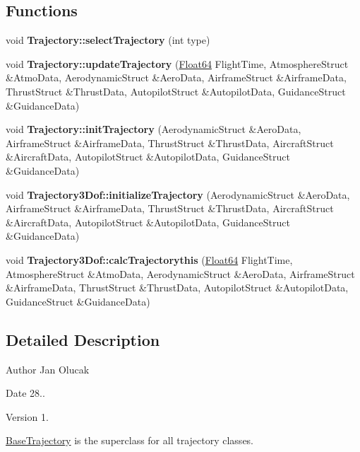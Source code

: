 \subsection*{Functions}
\begin{DoxyCompactItemize}
\item 
\mbox{\label{group___trajectory_gade7c1162e2dbb9b6a58e4b14edc47a23}} 
void {\bfseries Trajectory\+::select\+Trajectory} (int type)
\item 
\mbox{\label{group___trajectory_gac3cc55da380fc14a615f861e1a61bbc9}} 
void {\bfseries Trajectory\+::update\+Trajectory} (\hyperlink{group___tools_ga3f1431cb9f76da10f59246d1d743dc2c}{Float64} Flight\+Time, Atmosphere\+Struct \&Atmo\+Data, Aerodynamic\+Struct \&Aero\+Data, Airframe\+Struct \&Airframe\+Data, Thrust\+Struct \&Thrust\+Data, Autopilot\+Struct \&Autopilot\+Data, Guidance\+Struct \&Guidance\+Data)
\item 
\mbox{\label{group___trajectory_ga8db5cd315a89f82acb03e7ccc33a9c18}} 
void {\bfseries Trajectory\+::init\+Trajectory} (Aerodynamic\+Struct \&Aero\+Data, Airframe\+Struct \&Airframe\+Data, Thrust\+Struct \&Thrust\+Data, Aircraft\+Struct \&Aircraft\+Data, Autopilot\+Struct \&Autopilot\+Data, Guidance\+Struct \&Guidance\+Data)
\item 
\mbox{\label{group___trajectory_ga68fef9eacaf0f9d17623d8cae7d6b38f}} 
void {\bfseries Trajectory3\+Dof\+::initialize\+Trajectory} (Aerodynamic\+Struct \&Aero\+Data, Airframe\+Struct \&Airframe\+Data, Thrust\+Struct \&Thrust\+Data, Aircraft\+Struct \&Aircraft\+Data, Autopilot\+Struct \&Autopilot\+Data, Guidance\+Struct \&Guidance\+Data)
\item 
\mbox{\label{group___trajectory_ga494d521c5814926d3e073dafd639b1b9}} 
void {\bfseries Trajectory3\+Dof\+::calc\+Trajectorythis} (\hyperlink{group___tools_ga3f1431cb9f76da10f59246d1d743dc2c}{Float64} Flight\+Time, Atmosphere\+Struct \&Atmo\+Data, Aerodynamic\+Struct \&Aero\+Data, Airframe\+Struct \&Airframe\+Data, Thrust\+Struct \&Thrust\+Data, Autopilot\+Struct \&Autopilot\+Data, Guidance\+Struct \&Guidance\+Data)
\end{DoxyCompactItemize}


\subsection{Detailed Description}
\begin{DoxyAuthor}{Author}
Jan Olucak 
\end{DoxyAuthor}
\begin{DoxyDate}{Date}
28.. 
\end{DoxyDate}
\begin{DoxyVersion}{Version}
1.
\end{DoxyVersion}
\hyperlink{group___trajectory_class_base_trajectory}{Base\+Trajectory} is the superclass for all trajectory classes. 

